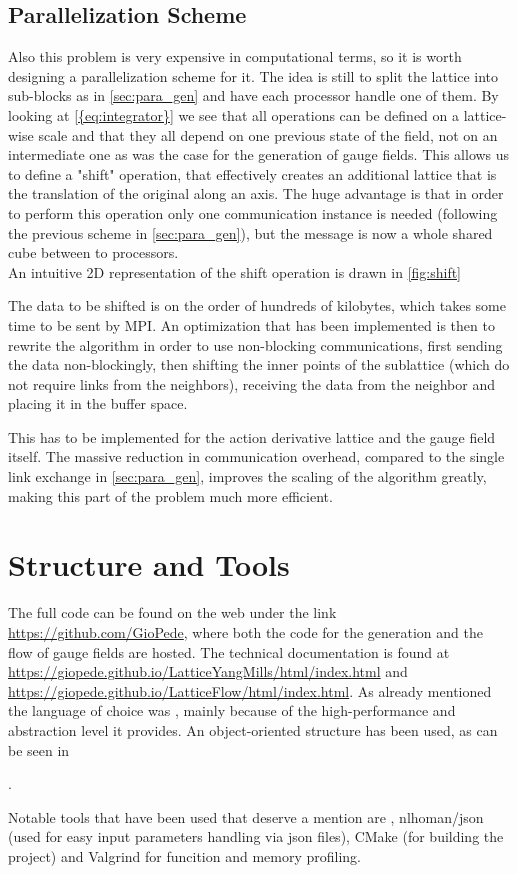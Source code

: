 \subsection{Parallelization Scheme}
Also this problem is very expensive in computational terms, so it is worth designing a parallelization scheme for it. The idea is still to split the lattice into sub-blocks as in \cref{sec:para_gen} and have each processor handle one of them.
By looking at \cref{{eq:integrator}} we see that all operations can be defined on a lattice-wise scale and that they all depend on one previous state of the field, not on an intermediate one as was the case for the generation of gauge fields. This allows us to define a "shift" operation, that effectively creates an additional lattice that is the translation of the original along an axis. The huge advantage is that in order to perform this operation only one communication instance is needed (following the previous scheme in \cref{sec:para_gen}), but the message is now a whole shared cube between to processors. \\
An intuitive 2D representation of the shift operation is drawn in \cref{fig:shift}


The data to be shifted is on the order of hundreds of kilobytes, which takes some time to be sent by MPI. An optimization that has been implemented is then to rewrite the algorithm in order to use non-blocking communications, first sending the data non-blockingly, then shifting the inner points of the sublattice (which do not require links from the neighbors), receiving the data from the neighbor and placing it in the buffer space.

This has to be implemented for the action derivative lattice and the gauge field itself. The massive reduction in communication overhead, compared to the single link exchange in \cref{sec:para_gen}, improves the scaling of the algorithm greatly, making this part of the problem much more efficient.


\section{Structure and Tools}
The full code can be found on the web under the link \url{https://github.com/GioPede}, where both the code for the generation and the flow of gauge fields are hosted. The technical documentation is found at \url{https://giopede.github.io/LatticeYangMills/html/index.html} and \url{https://giopede.github.io/LatticeFlow/html/index.html}. As already mentioned the language of choice was \cpp, mainly because of the high-performance and abstraction level it  provides. An object-oriented structure has been used, as can be seen in 

. 

Notable tools that have been used that deserve a mention are \mpi, nlhoman/json \cite{noauthor_json/index.md_nodate} (used for easy input parameters handling via json files), CMake (for building the project) and Valgrind for funcition and memory profiling. 
